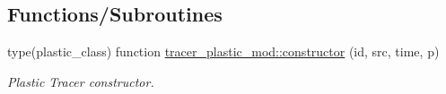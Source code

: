 \subsection*{Functions/\+Subroutines}
\begin{DoxyCompactItemize}
\item 
type(plastic\+\_\+class) function \mbox{\hyperlink{namespacetracer__plastic__mod_a04049a86055ae0f3f4e26ae51761a5a2}{tracer\+\_\+plastic\+\_\+mod\+::constructor}} (id, src, time, p)
\begin{DoxyCompactList}\small\item\em Plastic Tracer constructor. \end{DoxyCompactList}\end{DoxyCompactItemize}
